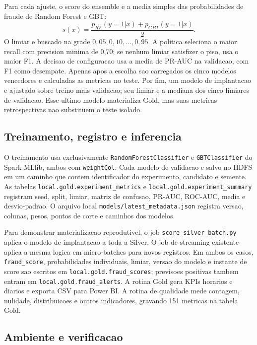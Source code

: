 \documentclass[10pt,twocolumn]{article}
\begin{document}
Para cada ajuste, o score do ensemble e a media simples das probabilidades de fraude de Random Forest e GBT:
\begin{equation}
s(x) = \frac{p_{RF}(y=1|x) + p_{GBT}(y=1|x)}{2}.
\end{equation}
O limiar e buscado na grade $0{,}05, 0{,}10, \ldots, 0{,}95$. A politica seleciona o maior recall com precision minima de 0,70; se nenhum limiar satisfizer o piso, usa o maior F1. A decisao de configuracao usa a media de PR-AUC na validacao, com F1 como desempate. Apenas apos a escolha sao carregados os cinco modelos vencedores e calculadas as metricas no teste. Por fim, um modelo de implantacao e ajustado sobre treino mais validacao; seu limiar e a mediana dos cinco limiares de validacao. Esse ultimo modelo materializa Gold, mas suas metricas retrospectivas nao substituem o teste isolado.

\subsection{Treinamento, registro e inferencia}

O treinamento usa exclusivamente \texttt{RandomForestClassifier} e \texttt{GBTClassifier} do Spark MLlib, ambos com \texttt{weightCol}. Cada modelo de validacao e salvo no HDFS em um caminho que contem identificador do experimento, candidato e semente. As tabelas \texttt{local.gold.experiment\_metrics} e \texttt{local.gold.experiment\_summary} registram seed, split, limiar, matriz de confusao, PR-AUC, ROC-AUC, media e desvio-padrao. O arquivo local \texttt{models/latest\_metadata.json} registra versao, colunas, pesos, pontos de corte e caminhos dos modelos.

Para demonstrar materializacao reprodutivel, o job \texttt{score\_silver\_batch.py} aplica o modelo de implantacao a toda a Silver. O job de streaming existente aplica a mesma logica em micro-batches para novos registros. Em ambos os casos, \texttt{fraud\_score}, probabilidades individuais, limiar, versao do modelo e instante de score sao escritos em \texttt{local.gold.fraud\_scores}; previsoes positivas tambem entram em \texttt{local.gold.fraud\_alerts}. A rotina Gold gera KPIs horarios e diarios e exporta CSV para Power BI. A rotina de qualidade mede contagem, nulidade, distribuicoes e outros indicadores, gravando 151 metricas na tabela Gold.

\subsection{Ambiente e verificacao}
\end{document}
